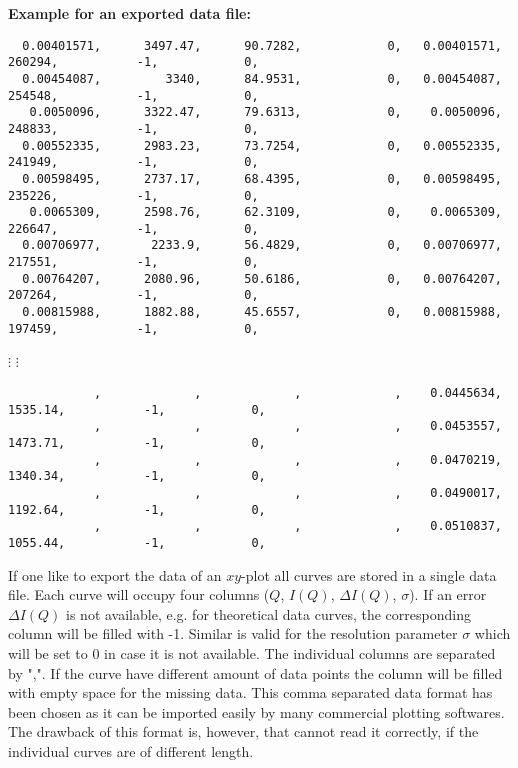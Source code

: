 \noindent
{\bf Example for an exported data file:}\\
{\tiny
\begin{verbatim}
  0.00401571,      3497.47,      90.7282,            0,   0.00401571,       260294,           -1,            0,
  0.00454087,         3340,      84.9531,            0,   0.00454087,       254548,           -1,            0,
   0.0050096,      3322.47,      79.6313,            0,    0.0050096,       248833,           -1,            0,
  0.00552335,      2983.23,      73.7254,            0,   0.00552335,       241949,           -1,            0,
  0.00598495,      2737.17,      68.4395,            0,   0.00598495,       235226,           -1,            0,
   0.0065309,      2598.76,      62.3109,            0,    0.0065309,       226647,           -1,            0,
  0.00706977,       2233.9,      56.4829,            0,   0.00706977,       217551,           -1,            0,
  0.00764207,      2080.96,      50.6186,            0,   0.00764207,       207264,           -1,            0,
  0.00815988,      1882.88,      45.6557,            0,   0.00815988,       197459,           -1,            0,
\end{verbatim}
\centerline{$\vdots$ \hspace{5cm} $\vdots$}
\begin{verbatim}
            ,             ,             ,             ,    0.0445634,      1535.14,           -1,            0,
            ,             ,             ,             ,    0.0453557,      1473.71,           -1,            0,
            ,             ,             ,             ,    0.0470219,      1340.34,           -1,            0,
            ,             ,             ,             ,    0.0490017,      1192.64,           -1,            0,
            ,             ,             ,             ,    0.0510837,      1055.44,           -1,            0,
\end{verbatim}
} If one like to export the data of an $xy$-plot all curves are
stored in a single data file. Each curve will occupy four columns
($Q$, $I(Q)$, $\Delta I(Q)$, $\sigma$). If an error $\Delta I(Q)$ is
not available, e.g. for theoretical data curves, the corresponding
column will be filled with -1. Similar is valid for the resolution
parameter $\sigma$ which will be set to 0 in case it is not
available. The individual columns are separated by ",". If the curve
have different amount of data points the column will be filled with
empty space for the missing data. This comma separated data format
has been chosen as it can be imported easily by many commercial
plotting softwares. The drawback of this format is, however, that
\SASfit cannot read it correctly, if the individual curves are of
different length.
